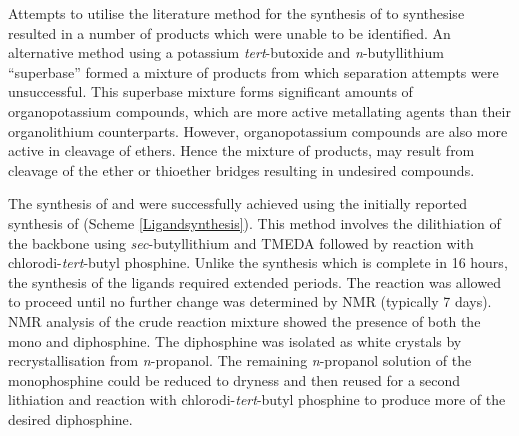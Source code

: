 {%

Attempts to utilise the literature method for the synthesis of \tBuxantphos{}\cite{Mispelaere2005} to synthesise \tButhixantphos{} resulted in a number of products which were unable to be identified.  An alternative method using a potassium \emph{tert}-butoxide and \emph{n}-butyllithium ``superbase'' formed a mixture of products from which separation attempts were unsuccessful.  This superbase mixture forms significant amounts of organopotassium compounds, which are more active metallating agents than their organolithium counterparts.  However, organopotassium compounds are also more active in cleavage of ethers.\cite{Bhatt1983}  Hence the mixture of products, may result from cleavage of the ether or thioether bridges resulting in undesired compounds.


The synthesis of \tButhixantphos{} and \tBusixantphos{} were successfully achieved using the initially reported synthesis of \Phxantphos{}\cite{Kranenburg1995} (Scheme \ref{Ligandsynthesis}).  This method involves the dilithiation of the backbone using \emph{sec}-butyllithium and \gls{TMEDA} followed by reaction with chlorodi-\emph{tert}-butyl phosphine.  Unlike the \Phxantphos{} synthesis which is complete in 16 hours, the synthesis of the \tBu{} ligands required extended periods.  The reaction was allowed to proceed until no further change was determined by NMR (typically 7 days).  NMR analysis of the crude reaction mixture showed the presence of both the mono and diphosphine.  The diphosphine was isolated as white crystals by recrystallisation from \emph{n}-propanol.  The remaining \emph{n}-propanol solution of the monophosphine could be reduced to dryness and then reused for a second lithiation and reaction with chlorodi-\emph{tert}-butyl phosphine to produce more of the desired diphosphine.  


}
